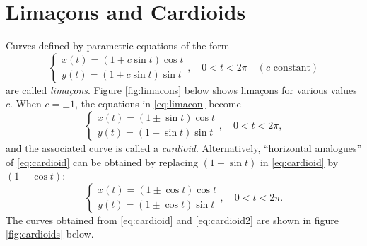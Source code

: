 \documentclass[12pt]{article}
\begin{document}
	\section*{Lima\c{c}ons and Cardioids}
	Curves defined by parametric equations of the form
	\begin{equation}
	\label{eq:limacon}
	\left\{
		\begin{array}{l}
		x(t)=(1+c\sin{t})\cos{t}\\
		y(t)=(1+c\sin{t})\sin{t}
		\end{array}
	\right.,\quad 0 < t < 2\pi\quad(c\text{ constant})\end{equation}
	are called \textit{lima\c{c}ons}. Figure \ref{fig:limacons} below shows lima\c{c}ons for various values $c$. When $c=\pm 1$, the equations in \eqref{eq:limacon} become
	\begin{equation}
	\label{eq:cardioid}
	\left\{
		\begin{array}{l}
		x(t)=(1\pm\sin{t})\cos{t}\\
		y(t)=(1\pm\sin{t})\sin{t}
		\end{array}
	\right.,\quad 0 < t < 2\pi,\end{equation}
	and the associated curve is called a \textit{cardioid}. Alternatively, ``horizontal analogues'' of \eqref{eq:cardioid} can be obtained by replacing $(1+\sin{t})$ in \eqref{eq:cardioid} by $(1+\cos{t})$:
	\begin{equation}
	\label{eq:cardioid2}
		\left\{
		\begin{array}{l}
		x(t)=(1\pm\cos{t})\cos{t}\\
		y(t)=(1\pm\cos{t})\sin{t}
		\end{array}
	\right.,\quad 0 < t < 2\pi.\end{equation}
	The curves obtained from \eqref{eq:cardioid} and \eqref{eq:cardioid2} are shown in figure \ref{fig:cardioids} below.
\end{document}
